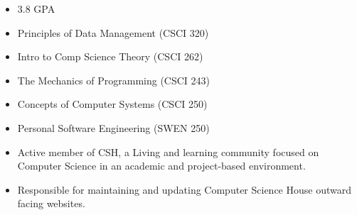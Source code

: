 \begin{itemize}
    \item 3.8 GPA
  \end{itemize}

\vspace{0.25cm}
\begin{itemize}
    \item Principles of Data Management (CSCI 320)
    \item Intro to Comp Science Theory (CSCI 262)
    \item The Mechanics of Programming (CSCI 243)
    \item Concepts of Computer Systems (CSCI 250)
    \item Personal Software Engineering (SWEN 250)
\end{itemize}

\vspace{0.25cm}

\vspace{0.25cm}

\smallskip
\newline

\vspace{0.25cm}

\begin{itemize}
    \item Active member of CSH, a Living and learning community focused on Computer Science in an academic and project-based environment.
  \end{itemize}

\begin{itemize}
  \item Responsible for maintaining and updating Computer Science House outward facing websites.
\end{itemize}

